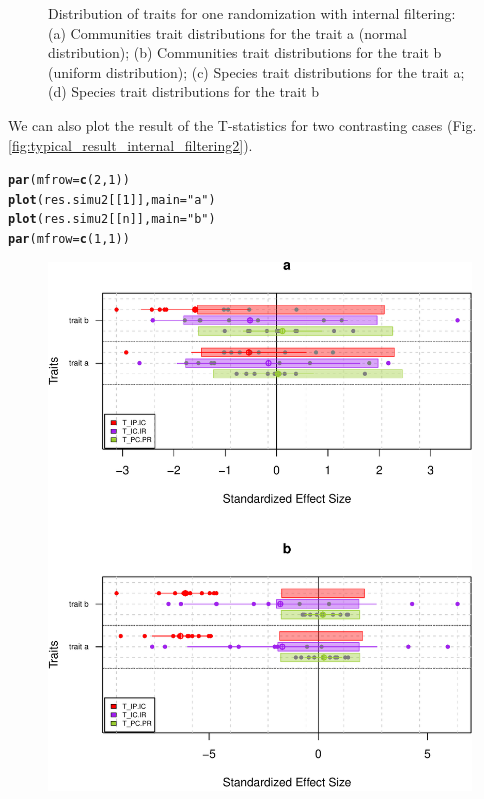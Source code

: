 \documentclass[12pt]{article}\usepackage[]{graphicx}\usepackage[]{color}
\makeatletter
\def\maxwidth{ %
  \ifdim\Gin@nat@width>\linewidth
    \linewidth
  \else
    \Gin@nat@width
  \fi
}
\newcommand{\hlnum}[1]{\textcolor[rgb]{0.686,0.059,0.569}{#1}}%
\newcommand{\hlstr}[1]{\textcolor[rgb]{0.192,0.494,0.8}{#1}}%
\newcommand{\hlstd}[1]{\textcolor[rgb]{0.345,0.345,0.345}{#1}}%
\newcommand{\hlkwc}[1]{\textcolor[rgb]{0.333,0.667,0.333}{#1}}%
\newcommand{\hlkwd}[1]{\textcolor[rgb]{0.737,0.353,0.396}{\textbf{#1}}}%
\newenvironment{kframe}{%
 \def\at@end@of@kframe{}%
 \ifinner\ifhmode%
  \def\at@end@of@kframe{\end{minipage}}%
  \begin{minipage}{\columnwidth}%
 \fi\fi%
 \def\FrameCommand##1{\hskip\@totalleftmargin \hskip-\fboxsep
 \colorbox{shadecolor}{##1}\hskip-\fboxsep
     \hskip-\linewidth \hskip-\@totalleftmargin \hskip\columnwidth}%
 \MakeFramed {\advance\hsize-\width
   \@totalleftmargin\z@ \linewidth\hsize
   \@setminipage}}%
 {\par\unskip\endMakeFramed%
 \at@end@of@kframe}
\newenvironment{knitrout}{}{} %
\makeatother
\begin{document}
\begin{knitrout}
\begin{figure}
{}

\caption[Distribution of traits for one randomization with internal filtering]{Distribution of traits for one randomization with internal filtering: (a) Communities trait distributions for the trait a (normal distribution); (b) Communities trait distributions for the trait b (uniform distribution); (c) Species trait distributions for the trait a; (d) Species trait distributions for the trait b}\label{fig:typical_result_internal_filtering1}
\end{figure}


\end{knitrout}

We can also plot the result of the T-statistics for two contrasting cases (Fig. \ref{fig:typical_result_internal_filtering2}).

\begin{knitrout}\small
{}\color{fgcolor}\begin{kframe}
\begin{alltt}
\hlkwd{par}\hlstd{(}\hlkwc{mfrow}\hlstd{=}\hlkwd{c}\hlstd{(}\hlnum{2}\hlstd{,} \hlnum{1}\hlstd{))}
\hlkwd{plot}\hlstd{(res.simu2[[}\hlnum{1}\hlstd{]],} \hlkwc{main}\hlstd{=}\hlstr{"a"}\hlstd{)}
\hlkwd{plot}\hlstd{(res.simu2[[n]],} \hlkwc{main}\hlstd{=}\hlstr{"b"}\hlstd{)}
\hlkwd{par}\hlstd{(}\hlkwc{mfrow}\hlstd{=}\hlkwd{c}\hlstd{(}\hlnum{1}\hlstd{,} \hlnum{1}\hlstd{))}
\end{alltt}
\end{kframe}\begin{figure}

{\centering \includegraphics[width=\maxwidth]{figure/typical_result_internal_filtering2-1} 

}
\end{figure}
\end{knitrout}
\end{document}
